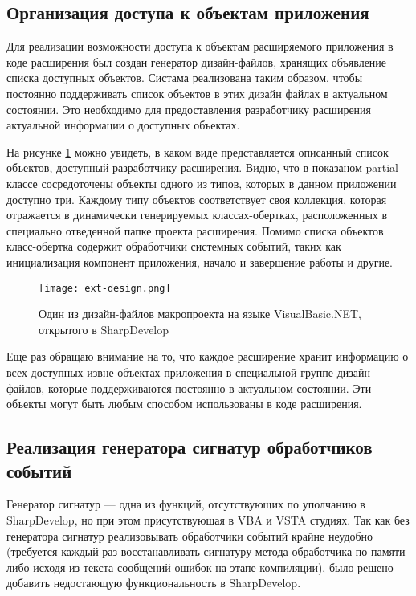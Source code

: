 \subsection{Организация доступа к объектам приложения}
\label{sec:ext_entry_point}

Для реализации возможности доступа к объектам расширяемого приложения в коде расширения был создан генератор дизайн-файлов, хранящих объявление списка доступных объектов. Систама реализована таким образом, чтобы постоянно поддерживать список объектов в этих дизайн файлах в актуальном состоянии. Это необходимо для предоставления разработчику расширения актуальной информации о доступных объектах.

На рисунке \ref{pic:ext_design} можно увидеть, в каком виде представляется описанный список объектов, доступный разработчику расширения. Видно, что в показаном partial-классе сосредоточены объекты одного из типов, которых в данном приложении доступно три. Каждому типу объектов соответствует своя коллекция, которая отражается в динамически генерируемых классах-обертках, расположенных в специально отведенной папке проекта расширения. Помимо списка объектов класс-обертка содержит обработчики системных событий, таких как инициализация компонент приложения, начало и завершение работы и другие.

\begin{figure}[!h]
    \centering
    \texttt{[image: ext-design.png]}
    \caption{Один из дизайн-файлов макропроекта на языке VisualBasic.NET, открытого в SharpDevelop}
    \label{pic:ext_design}
\end{figure}
 
 Еще раз обращаю внимание на то, что каждое расширение хранит информацию о всех доступных извне объектах приложения в специальной группе дизайн-файлов, которые поддерживаются постоянно в актуальном состоянии. Эти объекты могут быть любым способом использованы в коде расширения.
 

\subsection{Реализация генератора сигнатур обработчиков событий}
\label{sec:ehsg}

Генератор сигнатур --- одна из функций, отсутствующих по уполчанию в SharpDevelop, но при этом присутствующая в VBA и VSTA студиях. Так как без генератора сигнатур реализовывать обработчики событий крайне неудобно (требуется каждый раз восстанавливать сигнатуру метода-обработчика по памяти либо исходя из текста сообщений ошибок на этапе компиляции), было решено добавить недостающую функциональность в SharpDevelop.

